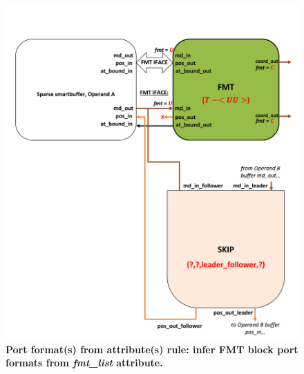 \begin{figure}[ht]
\includegraphics[width=\textwidth]{figures/safinference_build_02fmtporttype.png}
\caption{\textbf{Port format(s) from attribute(s) rule: infer FMT block port formats from \textit{fmt\_list} attribute. }}
\label{fig:safinference_build_02fmtporttype}
\centering
\end{figure}



